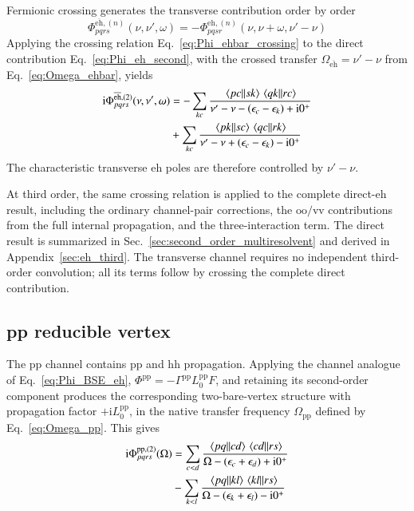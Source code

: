 \documentclass[aip,jcp,reprint,noshowkeys,superscriptaddress]{revtex4-1}
\newcommand{\eps}{\epsilon}
\newcommand{\ii}{\mathrm{i}}
\newcommand{\eh}{\text{eh}}
\newcommand{\teh}{\overline{\text{eh}}}
\newcommand{\pp}{\text{pp}}
\newcommand{\hh}{\text{hh}}
\begin{document}
Fermionic crossing generates the transverse contribution order by order
\begin{equation}
	\Phi^{\teh,(n)}_{pqrs}(\nu,\nu',\omega)
	=
	-
	\Phi^{\eh,(n)}_{pqsr}
	\left(
	\nu,
	\nu+\omega,
	\nu'-\nu
	\right)
	\label{eq:Phi_ehbar_crossing}
\end{equation}
Applying the crossing relation
Eq.~\eqref{eq:Phi_ehbar_crossing} to the direct contribution
Eq.~\eqref{eq:Phi_eh_second}, with the crossed transfer
$\Omega_{\teh}=\nu'-\nu$ from Eq.~\eqref{eq:Omega_ehbar}, yields
\begin{equation}
	\begin{split}
	\ii\Phi^{\teh,(2)}_{pqrs}(\nu,\nu',\omega)
	&=
	-
	\sum_{kc}
	\frac{
	\mel{pc}{}{sk}
	\mel{qk}{}{rc}
	}
	{\nu'-\nu-(\eps_c-\eps_k)+\ii0^+}
	\\
	&+
	\sum_{kc}
	\frac{
	\mel{pk}{}{sc}
	\mel{qc}{}{rk}
	}
	{\nu'-\nu+(\eps_c-\eps_k)-\ii0^+}
	\end{split}
	\label{eq:Phi_ehbar_second}
\end{equation}
The characteristic transverse $\eh$ poles are therefore controlled
by $\nu'-\nu$.

At third order, the same crossing relation is applied to the complete
direct-$\eh$ result, including the ordinary channel-pair corrections,
the $\text{oo}/\text{vv}$ contributions from the full internal propagation, and the three-interaction
term. The direct result is summarized in
Sec.~\ref{sec:second_order_multiresolvent} and derived in
Appendix~\ref{sec:eh_third}.
The transverse channel requires no independent third-order convolution;
all its terms follow by crossing the complete direct contribution.

\subsection{pp reducible vertex}

The $\pp$ channel contains $\pp$ and $\hh$ propagation.
Applying the channel analogue of Eq.~\eqref{eq:Phi_BSE_eh},
$\Phi^\pp=-\Gamma^\pp L_0^\pp F$, and retaining its second-order component
produces the corresponding two-bare-vertex structure with propagation
factor $+\ii L_0^\pp$, in the native transfer
frequency $\Omega_\pp$ defined by Eq.~\eqref{eq:Omega_pp}.
This gives
\begin{equation}
	\begin{split}
	\ii\Phi_{pqrs}^{\pp,(2)}(\Omega)
	&=
	\sum_{c<d}
	\frac{
	\mel{pq}{}{cd}
	\mel{cd}{}{rs}
	}
	{\Omega-(\eps_c+\eps_d)+\ii0^+}
	\\
	&-
	\sum_{k<l}
	\frac{
	\mel{pq}{}{kl}
	\mel{kl}{}{rs}
	}
	{\Omega-(\eps_k+\eps_l)-\ii0^+}
	\end{split}
	\label{eq:Phi_pp_second_native}
\end{equation}
\end{document}
